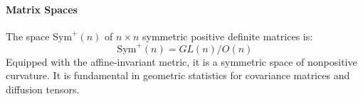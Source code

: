 \paragraph{Matrix Spaces}

\begin{definition}\label{def:spd_homogeneo}
The space $\mathrm{Sym}^+(n)$ of $n \times n$ symmetric positive definite matrices is:
\begin{equation}
\mathrm{Sym}^+(n) = GL(n)/O(n)
\end{equation}
Equipped with the affine-invariant metric, it is a symmetric space of nonpositive curvature. It is fundamental in geometric statistics for covariance matrices and diffusion tensors.
\end{definition}

